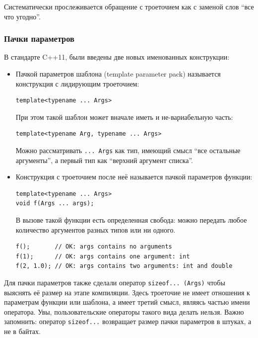 \documentclass[a4paper,12pt,oneside]{article}
\begin{document}
Систематически прослеживается обращение с троеточием как с заменой слов ``все что угодно''.

\subsubsection{Пачки параметров}\label{ParamPack}

В стандарте C++11, были введены две новых именованных конструкции: 

\begin{itemize}
\item
Пачкой параметров шаблона (template parameter pack) называется конструкция с лидирующим троеточием:

\begin{lstlisting}
template<typename ... Args>
\end{lstlisting}

При этом такой шаблон может вначале иметь и не-вариабельную часть:

\begin{lstlisting}
template<typename Arg, typename ... Args>
\end{lstlisting}

Можно рассматривать \lstinline!... Args! как тип, имеющий смысл ``все остальные аргументы'', а первый тип как ``верхний аргумент списка''.

\item
Конструкция с троеточием после неё называется пачкой параметров функции:

\begin{lstlisting}
template<typename ... Args>
void f(Args ... args);
\end{lstlisting}

В вызове такой функции есть определенная свобода: можно передать любое количество аргументов разных типов или ни одного.

\begin{lstlisting}
f();       // OK: args contains no arguments
f(1);      // OK: args contains one argument: int
f(2, 1.0); // OK: args contains two arguments: int and double
\end{lstlisting}
\end{itemize}

Для пачки параметров также сделали оператор \lstinline!sizeof... (Args)! чтобы выяснять её размер на этапе компиляции. Здесь троеточие не имеет отношения к параметрам функции или шаблона, а имеет третий смысл, являясь частью имени оператора. Увы, пользовательские операторы такого вида делать нельзя. Важно запомнить: оператор \lstinline!sizeof...! возвращает размер пачки параметров в штуках, а не в байтах.
\end{document}
